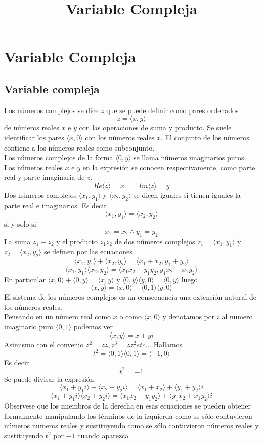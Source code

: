 \documentclass[10pt,a4paper]{book}
\title{Variable Compleja}
\begin{document}
\chapter{Variable Compleja}%
\section{Variable compleja}

Los números complejos se dice $z$ que se puede definir como pares ordenados $$z=\langle x,y\rangle$$ 
de números reales $x$ e $y$ con las operaciones de suma y producto. Se suele identificar los pares $\langle x,0 \rangle$ con los números reales $x$. El conjunto de los números contiene a los números reales como subconjunto. \\
Los números complejos de la forma $\langle 0,y\rangle$ se llama números imaginarios puros. Los números reales $x$ e $y$ en la expresión se conocen respectivamente, como parte real y parte imaginaria de $z$. $$Re\langle z\rangle=x \qquad Im\langle z\rangle=y$$ 
Dos números complejos $\langle x_{1},y_{1} \rangle $ y $\langle x_{2},y_{2} \rangle $ se dicen iguales si tienen iguales la parte real e imaginarios. Es decir $$\langle x_{1},y_{1} \rangle = \langle x_{2},y_{2} \rangle $$ si y solo si $$ x_{1}=x_{2} \wedge y_{1}=y_{2} $$ La suma $ z_{1} + z_{2} $ y el producto $ z_{1} z_{2}$ de dos números complejos $ z_{1}= \langle x_{1},y_{1} \rangle $ y $ z_{2}= \langle x_{2},y_{2} \rangle $ se definen por las ecuaciones $$\langle x_{1},y_{1} \rangle + \langle x_{2},y_{2} \rangle = \langle x_{1} + x_{2}, y_{1} + y_{2} \rangle $$
$$ \langle x_{1},y_{1} \rangle \langle x_{2},y_{2} \rangle = \langle x_{1} x_{2} - y_{1} y_{2}, y_{1} x_{2} - x_{1} y_{2} \rangle $$
En particular $ \langle x, 0 \rangle + \langle 0, y \rangle = \langle x, y \rangle$ y $ \langle 0, y \rangle \langle y, 0 \rangle = \langle 0, y \rangle $ luego $$ \langle x, y \rangle = \langle x, 0 \rangle + \langle 0, 1 \rangle \langle y, 0 \rangle $$
El sistema de los números complejos es un consecuencia una extensión natural de los números reales.\\
Pensando en un número real como $x$ o como $ \langle x,0 \rangle $ y denotamos por $i$ al numero imaginario puro $ \langle 0, 1 \rangle $ podemos ver $$ \langle x, y \rangle = x + y\textit{i} $$
Asimismo con el convenio $ z^{2}= z z, z^{3} = z z^{2} etc...$ Hallamos $$ t^{2} = \langle 0, 1 \rangle \langle 0, 1 \rangle = \langle -1, 0 \rangle $$
Es decir $$ t^{2} = -1 $$ 
Se puede divisar la expresión $$ \langle x_{1} + y_{1}\textit{i} \rangle + \langle x_{2} + y_{2}\textit{i} \rangle = \langle x_{1} + x_{2} \rangle + \langle y_{1} + y_{2}\rangle \textit{i}$$ $$ \langle x_{1} + y_{1}\textit{i} \rangle \langle x_{2} + y_{2}\textit{i} \rangle = \langle x_{1} x_{2} - y_{1} y_{2} \rangle + \langle y_{1} x_{2} + x_{1} y_{2} \rangle \textit{i} $$
Observese que los miembros de la derecha en esas ecuaciones se pueden obtener formalmente manipulando los términos de la izquierda como se sólo contuvieron números numeros reales y sustituyendo como se sólo contuvieron números reales y 
sustituyendo $t^{2} $ por $-1$ cuando aparezca
\end{document}
